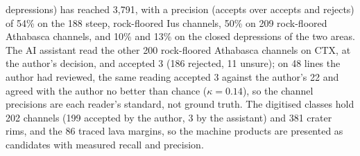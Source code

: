 depressions) has reached 3,791, with a precision (accepts over accepts and rejects) of 54\% on the 188 steep,
rock-floored Ius channels, 50\% on 209 rock-floored Athabasca channels, and 10\% and 13\% on the closed depressions
of the two areas. The AI assistant read the other 200 rock-floored Athabasca channels on CTX, at the author's
decision, and accepted 3 (186 rejected, 11 unsure); on 48 lines the author had reviewed, the same reading accepted 3
against the author's 22 and agreed with the author no better than chance ($\kappa=0.14$), so the channel precisions
are each reader's standard, not ground truth. The digitised classes hold 202 channels (199 accepted by the author, 3 by
the assistant) and 381 crater rims, and the 86 traced lava margins, so the machine products are presented as
candidates with measured recall and precision. %

